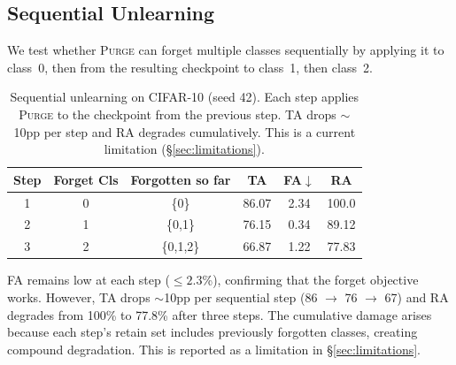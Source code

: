 \documentclass{article}
\newcommand{\ours}{\textsc{Purge}}
\newcommand{\newpar}[1]{{\color{orange}#1}}
\begin{document}
\newpar{
\subsection{Sequential Unlearning}\label{sec:sequential}

We test whether \ours{} can forget multiple classes sequentially by applying it to class~0, then from the resulting checkpoint to class~1, then class~2.

\begin{table}[t]
\centering
\small
\begin{tabular}{cccccc}
\toprule
Step & Forget Cls & Forgotten so far & TA & FA$\downarrow$ & RA \\
\midrule
1 & 0 & \{0\} & 86.07 & 2.34 & 100.0 \\
2 & 1 & \{0,1\} & 76.15 & 0.34 & 89.12 \\
3 & 2 & \{0,1,2\} & 66.87 & 1.22 & 77.83 \\
\bottomrule
\end{tabular}
\caption{Sequential unlearning on CIFAR-10 (seed 42). Each step applies \ours{} to the checkpoint from the previous step. TA drops $\sim$10pp per step and RA degrades cumulatively. This is a current limitation (\S\ref{sec:limitations}).}
\label{tab:sequential}
\end{table}

FA remains low at each step ($\le 2.3$\%), confirming that the forget objective works. However, TA drops $\sim$10pp per sequential step (86 $\to$ 76 $\to$ 67) and RA degrades from 100\% to 77.8\% after three steps. The cumulative damage arises because each step's retain set includes previously forgotten classes, creating compound degradation. This is reported as a limitation in \S\ref{sec:limitations}.
}
\end{document}
